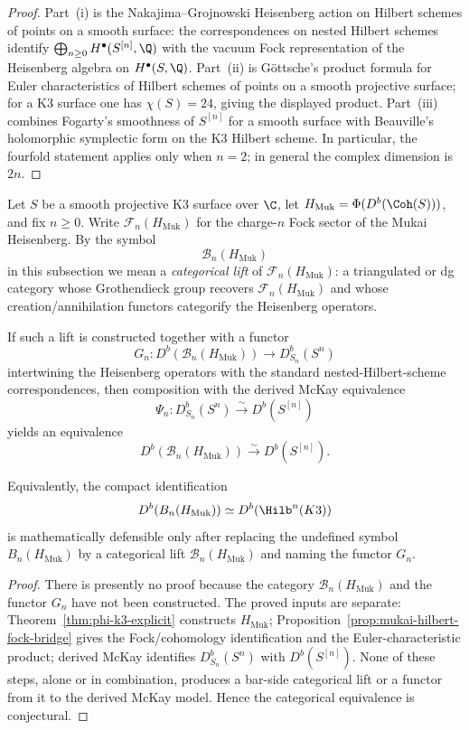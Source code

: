 \begin{proof}
Part~\textup{(i)} is the Nakajima--Grojnowski Heisenberg action on Hilbert schemes of points on a smooth surface: the correspondences on nested Hilbert schemes identify $\bigoplus_{n \ge 0} H^\bullet(S^{[n]},\Q)$ with the vacuum Fock representation of the Heisenberg algebra on $H^\bullet(S,\Q)$. Part~\textup{(ii)} is G\"ottsche's product formula for Euler characteristics of Hilbert schemes of points on a smooth projective surface; for a K3 surface one has $\chi(S)=24$, giving the displayed product. Part~\textup{(iii)} combines Fogarty's smoothness of $S^{[n]}$ for a smooth surface with Beauville's holomorphic symplectic form on the K3 Hilbert scheme. In particular, the fourfold statement applies only when $n=2$; in general the complex dimension is $2n$.
\end{proof}

\begin{conjecture}
\label{conj:categorical-dt-k3-fock-lift}
\ClaimStatusConjectured
Let $S$ be a smooth projective K3 surface over $\C$, let $H_{\mathrm{Muk}}=\Phi(D^b(\Coh(S)))$, and fix $n \ge 0$. Write $\mathscr{F}_n(H_{\mathrm{Muk}})$ for the charge-$n$ Fock sector of the Mukai Heisenberg. By the symbol
\[
 \mathscr{B}_n(H_{\mathrm{Muk}})
\]
in this subsection we mean a \emph{categorical lift} of $\mathscr{F}_n(H_{\mathrm{Muk}})$: a triangulated or dg category whose Grothendieck group recovers $\mathscr{F}_n(H_{\mathrm{Muk}})$ and whose creation/annihilation functors categorify the Heisenberg operators.

If such a lift is constructed together with a functor
\[
 G_n \colon D^b(\mathscr{B}_n(H_{\mathrm{Muk}})) \longrightarrow D^b_{S_n}(S^n)
\]
intertwining the Heisenberg operators with the standard nested-Hilbert-scheme correspondences, then composition with the derived McKay equivalence
\[
 \Psi_n \colon D^b_{S_n}(S^n) \xrightarrow{\sim} D^b(S^{[n]})
\]
yields an equivalence
\[
 D^b(\mathscr{B}_n(H_{\mathrm{Muk}})) \xrightarrow{\sim} D^b(S^{[n]}).
\]

Equivalently, the compact identification
\[
 D^b(B_n(H_{\mathrm{Muk}})) \simeq D^b(\Hilb^n(K3))
\]
is mathematically defensible only after replacing the undefined symbol $B_n(H_{\mathrm{Muk}})$ by a categorical lift $\mathscr{B}_n(H_{\mathrm{Muk}})$ and naming the functor $G_n$.
\end{conjecture}

\begin{proof}
There is presently no proof because the category $\mathscr{B}_n(H_{\mathrm{Muk}})$ and the functor $G_n$ have not been constructed. The proved inputs are separate: Theorem~\textup{\ref{thm:phi-k3-explicit}} constructs $H_{\mathrm{Muk}}$; Proposition~\textup{\ref{prop:mukai-hilbert-fock-bridge}} gives the Fock/cohomology identification and the Euler-characteristic product; derived McKay identifies $D^b_{S_n}(S^n)$ with $D^b(S^{[n]})$. None of these steps, alone or in combination, produces a bar-side categorical lift or a functor from it to the derived McKay model. Hence the categorical equivalence is conjectural.
\end{proof}

